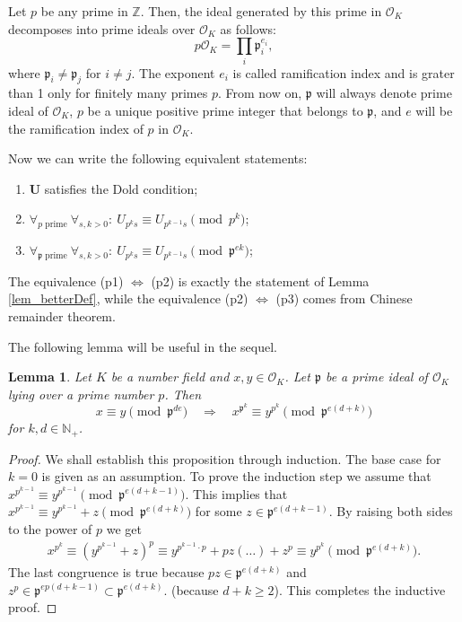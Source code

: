 \documentclass[preprint,12pt]{elsarticle}
\newcommand{\N}{\mathbb{N}}
\newcommand{\Z}{\mathbb{Z}}
\newcommand{\OO}{\mathcal{O}}
\newcommand{\pp}{\mathfrak{p} }
\newtheorem{lemma}{Lemma}
\begin{document}
Let $p$ be any prime in $\Z$. Then, the ideal generated by this prime in $\OO_K$ decomposes into prime ideals over $\OO_K$ as follows:
$$p\OO_K = \prod_i\pp_i^{e_i},$$ where $\pp_i\neq\pp_j$ for $i\neq j$. The exponent $e_i$ is called ramification index and is grater than 1 only for finitely many primes $p$. From now on, $\pp$ will always denote prime ideal of $\OO_K$, $p$ be a unique positive prime integer that belongs to $\pp$, and $e$ will be the ramification index of $p$ in $\OO_K$. 

Now we can write the following equivalent statements:
\begin{enumerate}
    \item[(p1)]  $\mathbf U$ satisfies the Dold condition;
    \item[(p2)] $\forall_{p \text{ prime}}\ \forall_{s,k>0}:\ U_{p^ks} \equiv U_{p^{k-1}s} \pmod {p^k} $;
    \item[(p3)] $\forall_{\pp \text{ prime}}\ \forall_{s,k>0}:\ U_{p^ks} \equiv U_{p^{k-1}s} \pmod {\pp^{ek}} $;
\end{enumerate}

The equivalence (p1) $\Leftrightarrow$ (p2) is exactly the statement of Lemma \ref{lem_betterDef}, while the equivalence (p2) $\Leftrightarrow$ (p3) comes from Chinese remainder theorem.  


\vskip 0.3cm
The following lemma will be useful in the sequel.

\begin{lemma}\label{lem_allInOne}
    Let $K$ be a number field and $x,y\in\OO_K$. Let $\pp$ be a prime ideal of $\OO_K$ lying over a prime number $p$. Then 
    $$ x \equiv y \pmod{\pp^{de}} \quad\Rightarrow\quad x^{\pp^k} \equiv y^{p^k} \pmod{\pp^{e(d+k)}}$$
    for $k, d\in \N_+$.
\end{lemma}
\begin{proof}
    We shall establish this proposition through induction. The base case for $k=0$ is given as an assumption. To prove the induction step we assume that $x^{p^{k-1}} \equiv y^{p^{k-1}} \pmod{\pp^{e(d+k-1)}}$. This implies that $x^{p^{k-1}} \equiv y^{p^{k-1}} + z\pmod {\pp^{e(d+k)}}$ for some $z\in \pp^{e(d+k-1)}$. By raising both sides to the power of $p$ we get 
    \begin{align}
        x^{p^k} \equiv 
        \left(y^{p^{k-1}} + z\right)^p \equiv
        y^{{p^{k-1}}\cdot p} + pz(\ldots) + z^p \equiv
        y^{p^{k}} \pmod {\pp^{e(d+k)}}.
    \end{align}
    The last congruence is true because $pz\in \pp^{e(d+k)}$ and $z^p\in\pp^{ep(d+k-1)}  \subset \pp^{e(d+k)}$. (because $d+k \geqslant 2$). This completes the inductive proof.
\end{proof}
\end{document}
